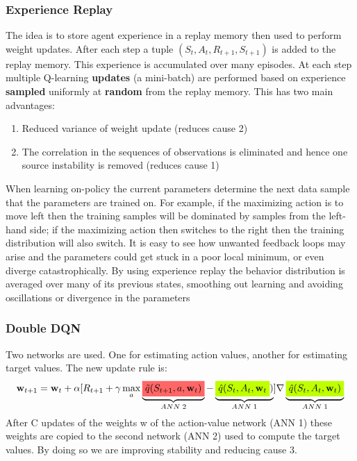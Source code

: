\subsubsection{Experience Replay}
The idea is to store agent experience in a replay memory then used to perform weight updates. After each step a tuple $(S_t, A_t, R_{t+1}, S_{t+1})$ is added to the replay memory. This experience is accumulated over many episodes. At each step  multiple Q-learning \textbf{updates} (a mini-batch) are performed based on experience \textbf{sampled} uniformly at \textbf{random} from the replay memory.
This has two main advantages:
\begin{enumerate}
    \item Reduced variance of weight update (reduces cause 2)
    \item The correlation in the sequences of observations is eliminated and hence one source instability is removed (reduces cause 1)
\end{enumerate}
When learning on-policy the current parameters determine the next data sample that the parameters are trained on. For example, if the maximizing action is to move left then the training samples will be dominated by samples from the left-hand side; if the maximizing action then switches to the right then the training distribution will also switch. It is easy to see how unwanted feedback loops may arise and the parameters could get stuck in a poor local minimum, or even diverge catastrophically. By using experience replay the behavior distribution is averaged over many of its previous states, smoothing out learning and avoiding oscillations or divergence in the parameters

\subsubsection{Double DQN}
Two networks are used. One for estimating action values, another for estimating target values.
The new update rule is:
\begin{align}
    \mathbf{w}_{t+1}=\mathbf{w}_t+\alpha[R_{t+1}+\gamma\max_a\underbrace{\colorbox{red!60!white}{$\Tilde{q}(S_{t+1}, a, \mathbf{w}_t)$}}_{ANN\;2}-\underbrace{\colorbox{lime}{$\hat{q}(S_t, A_t, \mathbf{w}_t$})}_{ANN\;1}]\nabla \underbrace{\colorbox{lime}{$\hat{q}(S_t, A_t, \mathbf{w}_t)$}}_{ANN\;1}
\end{align}
After C updates of the weights w of the action-value network (ANN 1) these weights are copied to the second network (ANN 2) used to compute the target values. By doing so we are improving stability and reducing cause 3.